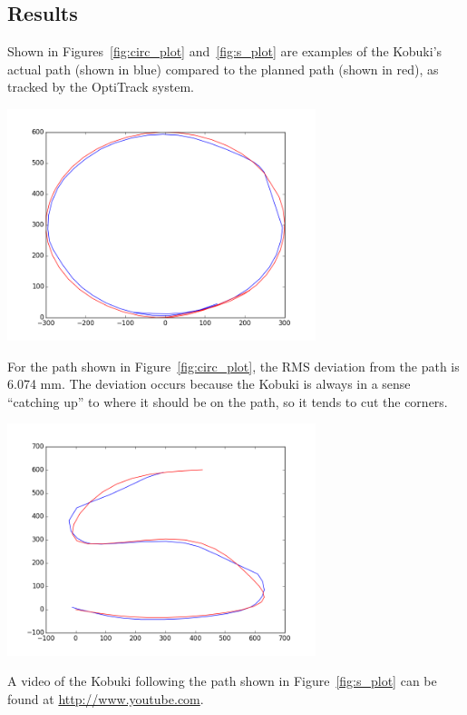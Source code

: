 \documentclass[10pt]{article}
\newenvironment{Figure}
  {\par\medskip\noindent\minipage{\linewidth}}
  {\endminipage\par\medskip}
\begin{document}
\begin{multicols*}{2}
  \section*{Results}
  Shown in Figures~\ref{fig:circ_plot} and~\ref{fig:s_plot} are examples of the
  Kobuki's actual path (shown in blue) compared to the planned path (shown in
  red), as tracked by the OptiTrack system.
  \begin{Figure}
    \includegraphics[width=9cm]{../plots/circle_plot.png}
    \label{fig:circ_plot}
  \end{Figure}

  For the path shown in Figure~\ref{fig:circ_plot}, the RMS deviation from the
  path is 6.074 mm. The deviation occurs because the Kobuki is always in a sense
  ``catching up'' to where it should be on the path, so it tends to cut the
  corners.

  \begin{Figure}
    \includegraphics[width=9cm]{../plots/s_plot.png}
     \label{fig:s_plot}
  \end{Figure}

  A video of the Kobuki following the path shown in Figure~\ref{fig:s_plot} can
  be found at \url{http://www.youtube.com}.


\end{multicols*}
\end{document}
